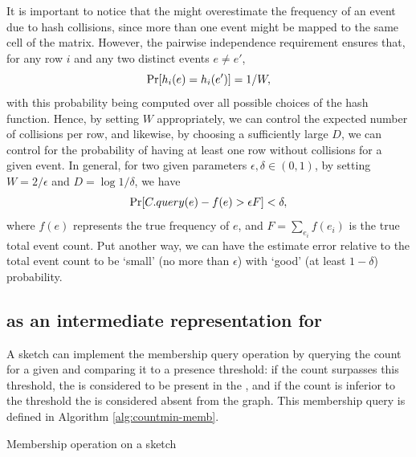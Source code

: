 It is important to notice that the \cm might overestimate the frequency of an event due to hash collisions, since more than one event might be mapped to the same cell of the matrix. However, the pairwise independence requirement ensures that, for any row $i$ and any two distinct events $e\neq e'$,
\begin{equation*}
\mathrm{Pr}[h_i(e)=h_i(e')] = 1/W,
\end{equation*}
with this probability being computed over all possible choices of the hash function.
Hence, by setting $W$ appropriately, we can control the expected number of collisions per row, and likewise, by choosing a sufficiently large $D$, we can control for the probability of having at least one row without collisions for a given event. In general, for two given parameters $\epsilon, \delta \in (0,1)$, by setting 
$W=2/\epsilon$ and $D=\log1/\delta$, we have
\begin{equation*}
\mathrm{Pr}[C.query(e) - f(e) > \epsilon F] < \delta,
\end{equation*}
where $f(e)$ represents the true frequency of $e$, and $F=\sum_{e_i}f(e_i)$ is the true total event count. Put another way, we can have the estimate error relative to the total event count to be `small' (no more than $\epsilon$) with `good' (at least $1-\delta$) probability.

\subsection{\cm as an intermediate representation for }


A \cm sketch can implement the membership query operation by querying the count for a given \kmer and comparing it to a presence threshold:
if the count surpasses this threshold, the \kmer is considered to be present in the \dBG, and if the count is inferior to the threshold the
\kmer is considered absent from the graph. This membership query is defined in Algorithm \ref{alg:countmin-memb}.

\begin{algorithm}[htbp]
  \caption{Membership operation on a \cm sketch}\label{alg:countmin-memb}
\end{algorithm}

